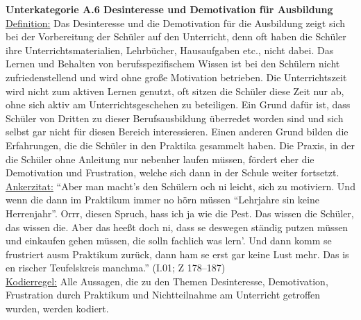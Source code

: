 \noindent
\textbf{Unterkategorie A.6 Desinteresse und Demotivation für Ausbildung}\\
\underline{Definition:} Das Desinteresse und die Demotivation für die Ausbildung zeigt sich bei der Vorbereitung der Schüler auf den Unterricht, denn oft haben die Schüler ihre Unterrichtsmaterialien, Lehrbücher, Hausaufgaben etc., nicht dabei. Das Lernen und Behalten von berufsspezifischem Wissen ist bei den Schülern nicht zufriedenstellend und wird ohne große Motivation betrieben. Die Unterrichtszeit wird nicht zum aktiven Lernen genutzt, oft sitzen die Schüler diese Zeit nur ab, ohne sich aktiv am Unterrichtsgeschehen zu beteiligen. Ein Grund dafür ist, dass Schüler von Dritten zu dieser Berufsausbildung überredet worden sind und sich selbst gar nicht für diesen Bereich interessieren. Einen anderen Grund bilden die Erfahrungen, die die Schüler in den Praktika gesammelt haben. Die Praxis, in der die Schüler ohne Anleitung nur nebenher laufen müssen, fördert eher die Demotivation und Frustration, welche sich dann in der Schule weiter fortsetzt.\\
\underline{Ankerzitat:} "`Aber man macht’s den Schülern och ni leicht, sich zu motiviern. Und wenn die dann im Praktikum immer no hörn müssen "`Lehrjahre sin keine Herrenjahr"'. Orrr, diesen Spruch, hass ich ja wie die Pest. Das wissen die Schüler, das wissen die. Aber das heeßt doch ni, dass se deswegen ständig putzen müssen und einkaufen gehen müssen, die solln fachlich was lern'. Und dann komm se frustriert ausm Praktikum zurück, dann ham se erst gar keine Lust mehr. Das is en rischer Teufelskreis manchma."' (I.01; Z 178--187)\\
\underline{Kodierregel:} Alle Aussagen, die zu den Themen Desinteresse, Demotivation, Frustration durch Praktikum und Nichtteilnahme am Unterricht getroffen wurden, werden kodiert.\\


